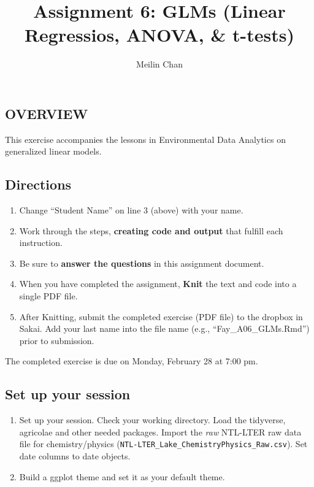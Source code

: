 \documentclass[
]{article}
\title{Assignment 6: GLMs (Linear Regressios, ANOVA, \& t-tests)}
\author{Meilin Chan}
\date{}
\providecommand{\tightlist}{%
  \setlength{\itemsep}{0pt}\setlength{\parskip}{0pt}}
\begin{document}
\maketitle

\hypertarget{overview}{%
\subsection{OVERVIEW}\label{overview}}

This exercise accompanies the lessons in Environmental Data Analytics on
generalized linear models.

\hypertarget{directions}{%
\subsection{Directions}\label{directions}}

\begin{enumerate}
\def\labelenumi{\arabic{enumi}.}
\tightlist
\item
  Change ``Student Name'' on line 3 (above) with your name.
\item
  Work through the steps, \textbf{creating code and output} that fulfill
  each instruction.
\item
  Be sure to \textbf{answer the questions} in this assignment document.
\item
  When you have completed the assignment, \textbf{Knit} the text and
  code into a single PDF file.
\item
  After Knitting, submit the completed exercise (PDF file) to the
  dropbox in Sakai. Add your last name into the file name (e.g.,
  ``Fay\_A06\_GLMs.Rmd'') prior to submission.
\end{enumerate}

The completed exercise is due on Monday, February 28 at 7:00 pm.

\hypertarget{set-up-your-session}{%
\subsection{Set up your session}\label{set-up-your-session}}

\begin{enumerate}
\def\labelenumi{\arabic{enumi}.}
\item
  Set up your session. Check your working directory. Load the tidyverse,
  agricolae and other needed packages. Import the \emph{raw} NTL-LTER
  raw data file for chemistry/physics
  (\texttt{NTL-LTER\_Lake\_ChemistryPhysics\_Raw.csv}). Set date columns
  to date objects.
\item
  Build a ggplot theme and set it as your default theme.
\end{enumerate}
\end{document}
